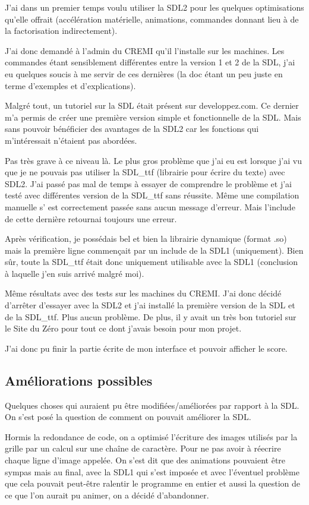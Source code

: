 \documentclass{article}
\begin{document}
J'ai dans un premier temps voulu utiliser la SDL2 pour les quelques optimisations qu'elle offrait (accélération matérielle, animations, commandes donnant lieu à de la factorisation indirectement).

J'ai donc demandé à l'admin du CREMI qu'il l'installe sur les machines. Les commandes étant sensiblement différentes entre la version 1 et 2 de la SDL, j'ai eu quelques soucis à me servir de ces dernières (la doc étant un peu juste en terme d'exemples et d'explications).

Malgré tout, un tutoriel sur la SDL était présent sur developpez.com. Ce dernier m'a permis de créer une première version simple et fonctionnelle de la SDL. Mais sans pouvoir bénéficier des avantages de la SDL2 car les fonctions qui m'intéressait n'étaient pas abordées.

Pas très grave à ce niveau là. Le plus gros problème que j'ai eu est lorsque j'ai vu que je ne pouvais pas utiliser la SDL\_ttf (librairie pour écrire du texte) avec SDL2. J'ai passé pas mal de temps à essayer de comprendre le problème et j'ai testé avec différentes version de la SDL\_ttf sans réussite. Même une compilation manuelle s' est correctement passée sans aucun message d'erreur. Mais l'include de cette dernière retournai toujours une erreur.

Après vérification, je possédais bel et bien la librairie dynamique (format .so) mais la première ligne commençait par un include de la SDL1 (uniquement). Bien sûr, toute la SDL\_ttf était donc uniquement utilisable avec la SDL1 (conclusion à laquelle j'en suis arrivé malgré moi).

Même résultats avec des tests sur les machines du CREMI. J'ai donc décidé d'arrêter d'essayer avec la SDL2 et j'ai installé la première version de la SDL et de la SDL\_ttf. Plus aucun problème. De plus, il y avait un très bon tutoriel sur le Site du Zéro pour tout ce dont j'avais besoin pour mon projet.

J'ai donc pu finir la partie écrite de mon interface et pouvoir afficher le score.

\subsection{Améliorations possibles}Quelques choses qui auraient pu être modifiées/améliorées par rapport à la SDL.
On s'est posé la question de comment on pouvait améliorer la SDL.

Hormis la redondance de code, on a optimisé l'écriture des images utilisés par la grille par un calcul sur une chaîne de caractère. Pour ne pas avoir à réecrire chaque ligne d'image appelée. 
On s'est dit que des animations pouvaient être sympas mais au final, avec la SDL1 qui s'est imposée et avec l'éventuel problème que cela pouvait peut-être ralentir le programme en entier et aussi la question de ce que l'on aurait pu animer, on a décidé d'abandonner.
\end{document}
